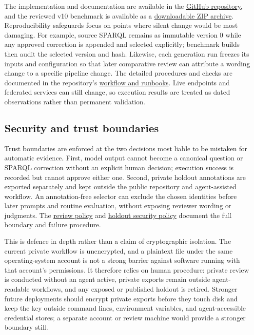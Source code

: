 The implementation and documentation are available in the \href{https://github.com/ppquadrat/musparql-aligner}{GitHub repository}, and the reviewed v10 benchmark is available as a \href{https://github.com/ppquadrat/musparql-aligner/releases/download/benchmark-v10/musparql-benchmark-v10.zip}{downloadable ZIP archive}. Reproducibility safeguards focus on points where silent change would be most damaging. For example, source SPARQL remains as immutable version 0 while any approved correction is appended and selected explicitly; benchmark builds then audit the selected version and hash. Likewise, each generation run freezes its inputs and configuration so that later comparative review can attribute a wording change to a specific pipeline change. The detailed procedures and checks are documented in the repository's \href{https://github.com/ppquadrat/musparql-aligner/tree/main/docs}{workflow and runbooks}. Live endpoints and federated services can still change, so execution results are treated as dated observations rather than permanent validation.

\subsection{Security and trust boundaries}\label{security-and-trust-boundaries}

Trust boundaries are enforced at the two decisions most liable to be mistaken for automatic evidence. First, model output cannot become a canonical question or SPARQL correction without an explicit human decision; execution success is recorded but cannot approve either one. Second, private holdout annotations are exported separately and kept outside the public repository and agent-assisted workflow. An annotation-free selector can exclude the chosen identities before later prompts and routine evaluation, without exposing reviewer wording or judgments. The \href{https://github.com/ppquadrat/musparql-aligner/blob/main/docs/REVIEW_POLICY.md}{review policy} and \href{https://github.com/ppquadrat/musparql-aligner/blob/main/docs/HOLDOUT_SECURITY.md}{holdout security policy} document the full boundary and failure procedure.

This is defence in depth rather than a claim of cryptographic isolation. The current private workflow is unencrypted, and a plaintext file under the same operating-system account is not a strong barrier against software running with that account's permissions. It therefore relies on human procedure: private review is conducted without an agent active, private exports remain outside agent-readable workflows, and any exposed or published holdout is retired. Stronger future deployments should encrypt private exports before they touch disk and keep the key outside command lines, environment variables, and agent-accessible credential stores; a separate account or review machine would provide a stronger boundary still.

